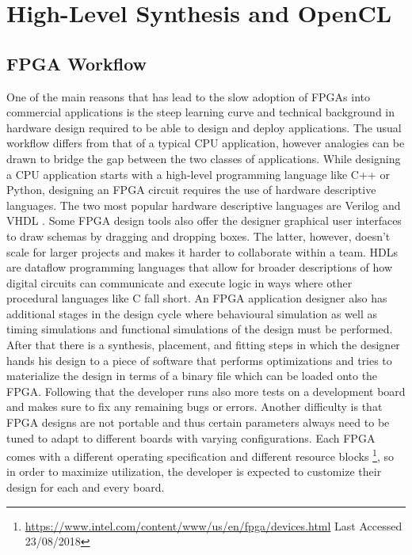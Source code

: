 
\section{High-Level Synthesis and OpenCL} 

\subsection{FPGA Workflow}
One of the main reasons that has lead to the slow adoption of FPGAs into commercial applications is the steep learning curve and technical background in hardware design required to be able to design and deploy applications. The usual workflow differs from that of a typical CPU application, however analogies can be drawn to bridge the gap between the two classes of applications. While designing a CPU application starts with a high-level programming language like C++ or Python, designing an FPGA circuit requires the use of hardware descriptive languages. The two most popular hardware descriptive languages are Verilog and VHDL \cite{wilson2015design}. Some FPGA design tools also offer the designer graphical user interfaces to draw schemas by dragging and dropping boxes. The latter, however, doesn’t scale for larger projects and makes it harder to collaborate within a team. HDLs are dataflow programming languages that allow for broader descriptions of how digital circuits can communicate and execute logic in ways where other procedural languages like C fall short. An FPGA application designer also has additional stages in the design cycle where behavioural simulation as well as timing simulations and functional simulations of the design must be performed. After that there is a synthesis, placement, and fitting steps in which the designer hands his design to a piece of software that performs optimizations and tries to materialize the design in terms of a binary file which can be loaded onto the FPGA. Following that the developer runs also more tests on a development board and makes sure to fix any remaining bugs or errors. Another difficulty is that FPGA designs are not portable and thus certain parameters always need to be tuned to adapt to different boards with varying configurations. Each FPGA comes with a different operating specification and different resource blocks \footnote{\url{https://www.intel.com/content/www/us/en/fpga/devices.html} Last Accessed 23/08/2018}, so in order to maximize utilization, the developer is expected to customize their design for each and every board. 

